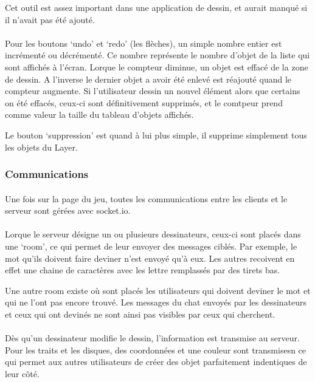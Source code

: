 \documentclass[11pt,a4paper]{article}
\begin{document}
                Cet outil est assez important dans une application de dessin,
                et aurait manqué si il n'avait pas été ajouté.
                \paragraph{}
                Pour les boutons `undo' et `redo' (les flèches), un simple nombre entier est incrémenté ou décrémenté.
                Ce nombre représente le nombre d'objet de la liste qui sont affichés à l'écran.
                Lorque le compteur diminue, un objet est effacé de la zone de dessin.
                A l'inverse le dernier objet a avoir été enlevé est réajouté quand le compteur augmente.
                Si l'utilisateur dessin un nouvel élément alors que certains on été effacés,
                ceux-ci sont définitivement supprimés,
                et le comtpeur prend comme valeur la taille du tableau d'objets affichés.

                Le bouton `suppression' est quand à lui plus simple, il supprime simplement tous les objets du Layer.
            \subsubsection{Communications}
                \paragraph{}
                Une fois sur la page du jeu, toutes les communications entre les clients et le serveur sont gérées avec socket.io.
                \paragraph{}
                Lorque le serveur désigne un ou plusieurs dessinateurs, ceux-ci sont placés dans une `room',
                ce qui permet de leur envoyer des messages ciblés.
                Par exemple, le mot qu'ils doivent faire deviner n'est envoyé qu'à eux.
                Les autres recoivent en effet une chaine de caractères avec les lettre remplassés par des tirets bas.

                Une autre room existe où sont placés les utilisateurs qui doivent deviner le mot et qui ne l'ont pas encore trouvé.
                Les messages du chat envoyés par les dessinateurs et ceux qui ont devinés ne sont ainsi pas visibles par ceux qui cherchent.
                \paragraph{}
                Dès qu'un dessinateur modifie le dessin, l'information est transmise au serveur.
                Pour les traits et les disques,
                des coordonnées et une couleur sont transmisesn ce qui permet aux autres utilisateurs de créer des objet parfaitement indentiques de leur côté.
\end{document}
